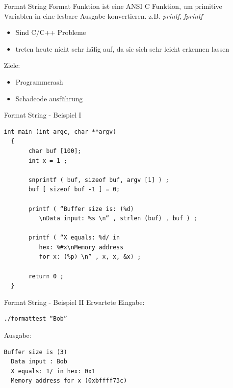\documentclass[10pt]{beamer}
\begin{document}
\begin{frame}[fragile]{Format String}
  Format Funktion ist eine ANSI C Funktion, um primitive Variablen in eine lesbare Ausgabe konvertieren. z.B. \textit{printf}, \textit{fprintf}
  \begin{itemize}
    \item Sind C/C++ Probleme
    \item treten heute nicht sehr h\"afig auf, da sie sich sehr leicht erkennen lassen
  \end{itemize}
  Ziele:
  \begin{itemize}
    \item Programmcrash
    \item Schadcode ausf\"uhrung
  \end{itemize}
\end{frame}

\begin{frame}[fragile]{Format String - Beispiel I}

  \begin{lstlisting}[style=CStyle]
  int main (int argc, char **argv)
  {
	   char buf [100];
	   int x = 1 ;

	   snprintf ( buf, sizeof buf, argv [1] ) ;
	   buf [ sizeof buf -1 ] = 0;

	   printf ( “Buffer size is: (%d)
          \nData input: %s \n” , strlen (buf) , buf ) ;

	   printf ( “X equals: %d/ in
          hex: %#x\nMemory address
          for x: (%p) \n” , x, x, &x) ;

	   return 0 ;
  }
  \end{lstlisting}
\end{frame}

\begin{frame}[fragile]{Format String - Beispiel II}
  Erwartete Eingabe:
  \begin{lstlisting}[style=BashStyle]
  ./formattest “Bob”
  \end{lstlisting}
  Ausgabe:
  \begin{lstlisting}[style=BashStyle]
  Buffer size is (3)
  Data input : Bob
  X equals: 1/ in hex: 0x1
  Memory address for x (0xbffff73c)
  \end{lstlisting}
\end{frame}
\end{document}
